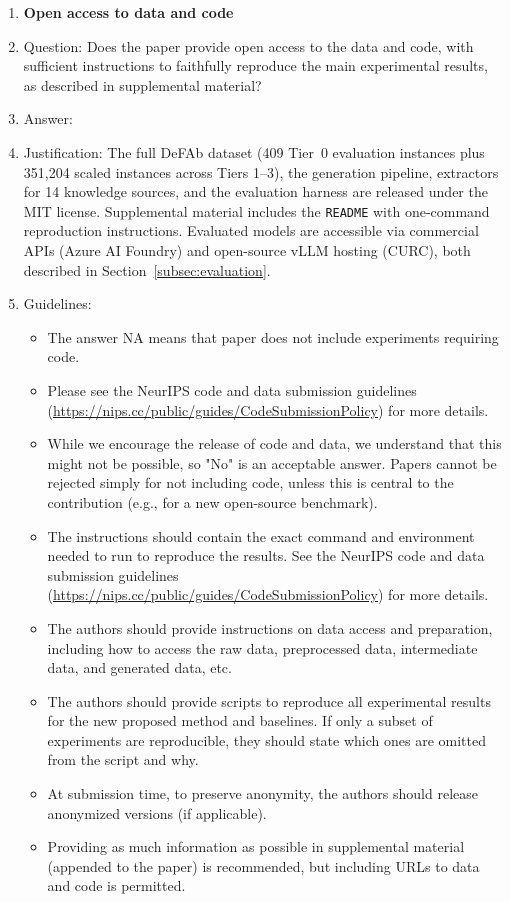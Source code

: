 \documentclass{article}
\theoremstyle{definition}
\begin{document}
\begin{enumerate}
\item {\bf Open access to data and code}
    \item[] Question: Does the paper provide open access to the data and code, with sufficient instructions to faithfully reproduce the main experimental results, as described in supplemental material?
    \item[] Answer: \answerYes{}
    \item[] Justification: The full DeFAb dataset (409 Tier~0 evaluation instances plus 351,204 scaled instances across Tiers 1--3), the generation pipeline, extractors for 14 knowledge sources, and the evaluation harness are released under the MIT license. Supplemental material includes the \texttt{README} with one-command reproduction instructions. Evaluated models are accessible via commercial APIs (Azure AI Foundry) and open-source vLLM hosting (CURC), both described in Section~\ref{subsec:evaluation}.
    \item[] Guidelines:
    \begin{itemize}
        \item The answer NA means that paper does not include experiments requiring code.
        \item Please see the NeurIPS code and data submission guidelines (\url{https://nips.cc/public/guides/CodeSubmissionPolicy}) for more details.
        \item While we encourage the release of code and data, we understand that this might not be possible, so "No" is an acceptable answer. Papers cannot be rejected simply for not including code, unless this is central to the contribution (e.g., for a new open-source benchmark).
        \item The instructions should contain the exact command and environment needed to run to reproduce the results. See the NeurIPS code and data submission guidelines (\url{https://nips.cc/public/guides/CodeSubmissionPolicy}) for more details.
        \item The authors should provide instructions on data access and preparation, including how to access the raw data, preprocessed data, intermediate data, and generated data, etc.
        \item The authors should provide scripts to reproduce all experimental results for the new proposed method and baselines. If only a subset of experiments are reproducible, they should state which ones are omitted from the script and why.
        \item At submission time, to preserve anonymity, the authors should release anonymized versions (if applicable).
        \item Providing as much information as possible in supplemental material (appended to the paper) is recommended, but including URLs to data and code is permitted.
    \end{itemize}



\end{enumerate}
\end{document}
